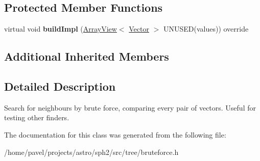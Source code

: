 \subsection*{Protected Member Functions}
\begin{DoxyCompactItemize}
\item 
\hypertarget{classBruteForceFinder_a5fa881f7d87ae23d10759c873855448f}{}\label{classBruteForceFinder_a5fa881f7d87ae23d10759c873855448f} 
virtual void {\bfseries build\+Impl} (\hyperlink{classArrayView}{Array\+View}$<$ \hyperlink{classBasicVector}{Vector} $>$ U\+N\+U\+S\+ED(values)) override
\end{DoxyCompactItemize}
\subsection*{Additional Inherited Members}


\subsection{Detailed Description}
Search for neighbours by \textquotesingle{}brute force\textquotesingle{}, comparing every pair of vectors. Useful for testing other finders. 

The documentation for this class was generated from the following file\+:\begin{DoxyCompactItemize}
\item 
/home/pavel/projects/astro/sph2/src/tree/bruteforce.\+h\end{DoxyCompactItemize}
